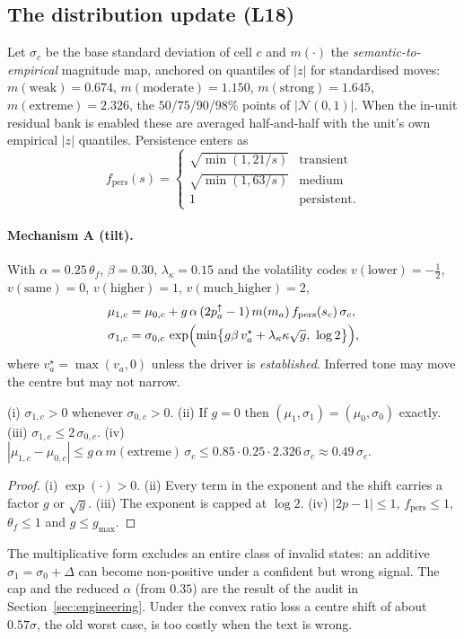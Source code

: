\subsection{The distribution update (L18)}

Let $\sigma_c$ be the base standard deviation of cell $c$ and $m(\cdot)$ the \emph{semantic-to-empirical} magnitude map, anchored on quantiles of
$|z|$ for standardised moves: $m(\text{weak})=0.674$, $m(\text{moderate})=1.150$, $m(\text{strong})=1.645$, $m(\text{extreme})=2.326$, the
$50$/$75$/$90$/$98$\% points of $|\mathcal N(0,1)|$. When the in-unit residual bank is enabled these are averaged half-and-half with the unit's own
empirical $|z|$ quantiles. Persistence enters as
\begin{equation}
  f_{\mathrm{pers}}(s)=\begin{cases}\sqrt{\min(1,21/s)} & \text{transient}\\ \sqrt{\min(1,63/s)} & \text{medium}\\ 1 & \text{persistent.}\end{cases}
\end{equation}

\paragraph{Mechanism A (tilt).} With $\alpha=0.25\,\theta_f$, $\beta=0.30$, $\lambda_\kappa=0.15$ and the volatility codes
$v(\text{lower})=-\tfrac12$, $v(\text{same})=0$, $v(\text{higher})=1$, $v(\text{much\_higher})=2$,
\begin{align}
  \mu_{1,c} &= \mu_{0,c}+g\,\alpha\,(2p^\uparrow_{a}-1)\,m(m_a)\,f_{\mathrm{pers}}(s_c)\,\sigma_c, \label{eq:tilt-mu}\\
  \sigma_{1,c} &= \sigma_{0,c}\,\exp\Bigl(\min\bigl\{g\beta\,v^\star_a+\lambda_\kappa\kappa\sqrt g,\ \log 2\bigr\}\Bigr), \label{eq:tilt-s}
\end{align}
where $v^\star_a=\max(v_a,0)$ unless the driver is \emph{established}. Inferred tone may move the centre but may not narrow.

\begin{proposition}\label{prop:tilt}
(i) $\sigma_{1,c}>0$ whenever $\sigma_{0,c}>0$. (ii) If $g=0$ then $(\mu_1,\sigma_1)=(\mu_0,\sigma_0)$ exactly. (iii) $\sigma_{1,c}\le2\,\sigma_{0,c}$.
(iv) $|\mu_{1,c}-\mu_{0,c}|\le g\,\alpha\,m(\text{extreme})\,\sigma_c\le 0.85\cdot0.25\cdot2.326\,\sigma_c\approx0.49\,\sigma_c$.
\end{proposition}
\begin{proof}
(i) $\exp(\cdot)>0$. (ii) Every term in the exponent and the shift carries a factor $g$ or $\sqrt g$. (iii) The exponent is capped at $\log2$.
(iv) $|2p-1|\le1$, $f_{\mathrm{pers}}\le1$, $\theta_f\le1$ and $g\le g_{\max}$.
\end{proof}
The multiplicative form excludes an entire class of invalid states: an additive $\sigma_1=\sigma_0+\Delta$ can become non-positive under a confident
but wrong signal. The cap and the reduced $\alpha$ (from $0.35$) are the result of the audit in Section~\ref{sec:engineering}. Under the convex ratio loss a
centre shift of about $0.57\sigma$, the old worst case, is too costly when the text is wrong.

